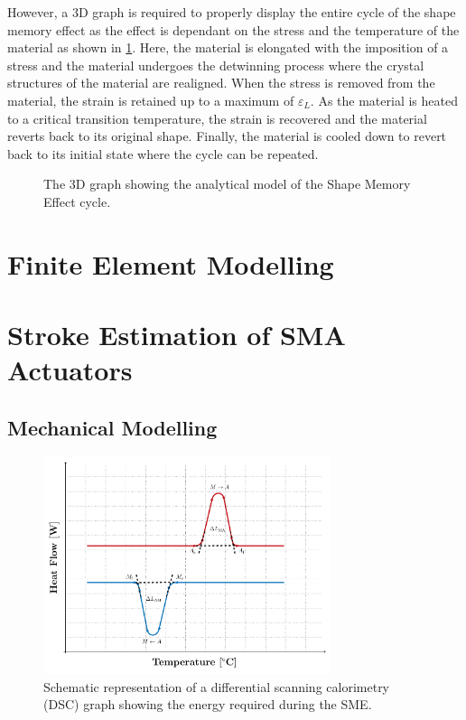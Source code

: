 However, a 3D graph is required to properly display the entire cycle of the shape memory effect as the effect is dependant on the stress and the temperature of the material as shown in \cref{fig:brinson-model-3d}. Here, the material is elongated with the imposition of a stress and the material undergoes the detwinning process where the crystal structures of the material are realigned. When the stress is removed from the material, the strain is retained up to a maximum of $\varepsilon_L$. As the material is heated to a critical transition temperature, the strain is recovered and the material reverts back to its original shape. Finally, the material is cooled down to revert back to its initial state where the cycle can be repeated.

\begin{figure}[hbt]
    \centering
    \resizebox{0.75\textwidth}{!}{}
    \caption{The 3D graph showing the analytical model of the Shape Memory Effect cycle.}
    \label{fig:brinson-model-3d}
\end{figure}

\section{Finite Element Modelling}
\section{Stroke Estimation of SMA Actuators}
\subsection{Mechanical Modelling}
\begin{figure}[hbt]
    \centering
    \includegraphics[width=0.75\textwidth]{images/chap2/dsc-graph.pdf}
    \caption{Schematic representation of a differential scanning calorimetry (DSC) graph showing the energy required during the SME.}
    \label{fig:dsc-graph}
\end{figure}
